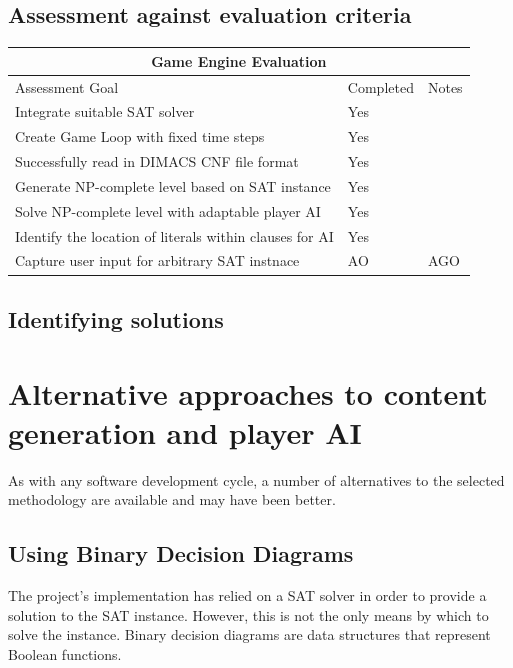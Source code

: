 \documentclass[11pt, a4paper, oneside]{report} %
\begin{document}

\subsection{Assessment against evaluation criteria}




\begin{center}
\begin{tabular}{ |p{5.5cm}|p{3cm}|p{5.5cm}|  }
 \hline
 \multicolumn{3}{|c|}{Game Engine Evaluation} \\
 \hline
 Assessment Goal & Completed & Notes \\
 \hline
 Integrate suitable SAT solver  & Yes &   \\ \hline
 Create Game Loop with fixed time steps &   Yes  &    \\ \hline
 Successfully read in DIMACS CNF file format & Yes &  \\ \hline
 Generate NP-complete level based on SAT instance  & Yes & \\ \hline
 Solve NP-complete level with adaptable player AI &   Yes &   \\ \hline
 Identify the location of literals within clauses for AI & Yes  &    \\ \hline
 Capture user input for arbitrary SAT instnace & AO  & AGO \\ \hline
\end{tabular}
\end{center}


\subsection{Identifying solutions}

\section{Alternative approaches to content generation and player AI}

As with any software development cycle, a number of alternatives to the selected
methodology are available and may have been better.

\subsection{Using Binary Decision Diagrams}

The project's implementation has relied on a SAT solver in order to provide a
solution to the SAT instance. However, this is not the only means by which to
solve the instance. Binary decision diagrams are data structures that represent
Boolean functions.
\end{document}

